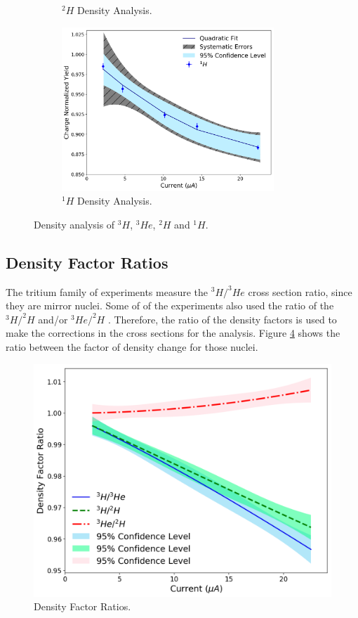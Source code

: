 \documentclass[final,5p,times,twocolumn,balance]{elsarticle}
\begin{document}
\begin{figure}[h]
\begin{center}
\begin{subfigure}{8cm}
    \caption{$^{2}H$ Density Analysis.}
    \label{fig:deuterium_data}
  \end{subfigure}
  \begin{subfigure}{8cm}
    \centering\includegraphics[width=8cm]{images/hydrogen_data.pdf}
    \caption{$^{1}H$ Density Analysis.}
    \label{fig:hydrogen_data}
  \end{subfigure}
  \end{center}
  \label{fig:tritium_targets}
  \caption{Density analysis of $^{3}H$, $^{3}He$, $^{2}H$ and $^{1}H$.}
\end{figure}




\subsection{Density Factor Ratios}

The tritium family of experiments measure the $^{3}H/^{3}He$ cross section ratio, since they are mirror nuclei.  Some of of the experiments also used the ratio of the $^{3}H/^{2}H $ and/or  $^{3}He/^{2}H $ . Therefore, the ratio of the density factors is used to make the corrections in the cross sections for the analysis. Figure \ref{fig:density_ratios} shows the ratio between the factor of density change for those nuclei. 


\begin{figure}[!h]
 \centering
 \includegraphics[width=\linewidth]{images/density_factor_ratios.pdf}
  \caption{Density Factor Ratios. }
  \label{fig:density_ratios}
\end{figure}
\end{document}
